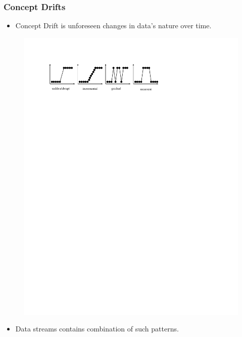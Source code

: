 \documentclass[14pt]{beamer}
\begin{document}
\begin{frame}\frametitle{Concept Drifts}
\begin{itemize}
\item Concept Drift is unforeseen changes in data's nature over time.
\end{itemize}

\vspace{0.1in}
\begin{figure}
\centering
\includegraphics[scale=1]{concept_drift}
\end{figure}
\pause

\begin{itemize}
\item Data streams contains combination of such patterns.
\end{itemize}
\end{frame}
\end{document}
